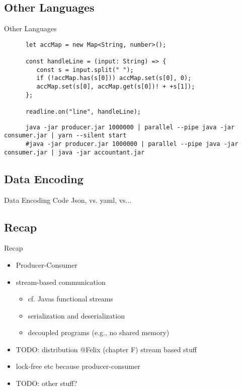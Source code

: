 {\subsection{Other Languages}
\begin{frame}[fragile]{Other Languages}
   \begin{verbatim}
      let accMap = new Map<String, number>();

      const handleLine = (input: String) => {
         const s = input.split(" ");
         if (!accMap.has(s[0])) accMap.set(s[0], 0);
         accMap.set(s[0], accMap.get(s[0])! + +s[1]);
      };

      readline.on("line", handleLine);

   \end{verbatim}
   \begin{verbatim}
      java -jar producer.jar 1000000 | parallel --pipe java -jar consumer.jar | yarn --silent start
      #java -jar producer.jar 1000000 | parallel --pipe java -jar consumer.jar | java -jar accountant.jar
   \end{verbatim}
\end{frame}
\subsection{Data Encoding}
\begin{frame}{Data Encoding}
      Code Json, vs. yaml, vs...
\end{frame}
}

\subsection{Recap} %
\begin{frame}{Recap}
   \begin{itemize}[<+(1)->]
      \itemsep12pt
      \item Producer-Consumer
      \item stream-based communication \begin{itemize}
         \item cf. Javas functional streams
         \item serialization and deserialization %
         \item decoupled programs (e.g., no shared memory)
      \end{itemize}
      \item TODO: distribution @Felix (chapter F) stream based stuff
      \item lock-free etc because producer-consumer
      \item TODO: other stuff?
   \end{itemize}
\end{frame}

